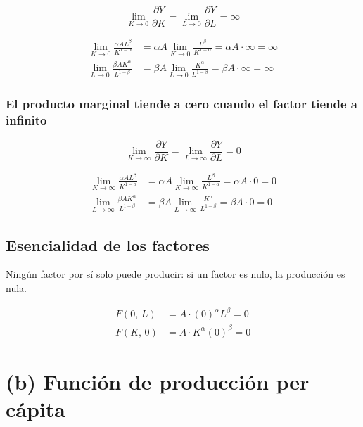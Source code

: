 \documentclass[11pt,a4paper]{article}
\begin{document}
\[
\lim_{K \to 0} \frac{\partial Y}{\partial K} = \lim_{L \to 0} \frac{\partial Y}{\partial L} = \infty
\]

\begin{align}
    \lim_{K \to 0} \frac{\alpha A L^{\beta}}{K^{1-\alpha}} &= \alpha A \lim_{K \to 0} \frac{L^{\beta}}{K^{1-\alpha}} = \alpha A \cdot \infty = \infty \\[6pt]
    \lim_{L \to 0} \frac{\beta A K^{\alpha}}{L^{1-\beta}} &= \beta A \lim_{L \to 0} \frac{K^{\alpha}}{L^{1-\beta}} = \beta A \cdot \infty = \infty
\end{align}

\subsubsection{El producto marginal tiende a cero cuando el factor tiende a infinito}

\[
\lim_{K \to \infty} \frac{\partial Y}{\partial K} = \lim_{L \to \infty} \frac{\partial Y}{\partial L} = 0
\]

\begin{align}
    \lim_{K \to \infty} \frac{\alpha A L^{\beta}}{K^{1-\alpha}} &= \alpha A \lim_{K \to \infty} \frac{L^{\beta}}{K^{1-\alpha}} = \alpha A \cdot 0 = 0 \\[6pt]
    \lim_{L \to \infty} \frac{\beta A K^{\alpha}}{L^{1-\beta}} &= \beta A \lim_{L \to \infty} \frac{K^{\alpha}}{L^{1-\beta}} = \beta A \cdot 0 = 0
\end{align}

\subsection{Esencialidad de los factores}

Ningún factor por sí solo puede producir: si un factor es nulo, la producción es nula.

\begin{align}
    F(0,\, L) &= A \cdot (0)^{\alpha} L^{\beta} = 0 \\[6pt]
    F(K,\, 0) &= A \cdot K^{\alpha} (0)^{\beta} = 0
\end{align}

\section{(b) Función de producción per cápita}
\end{document}
